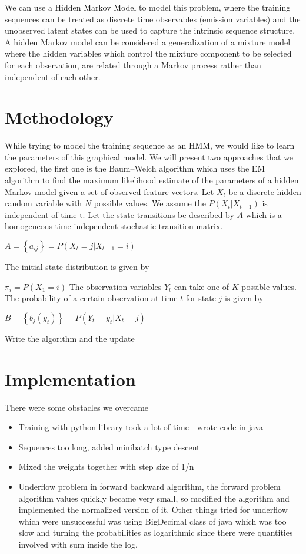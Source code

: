 We can use a Hidden Markov Model to model this problem, where the training sequences can be treated as discrete time observables (emission variables) and the unobserved latent states can be used to capture the intrinsic sequence structure. A hidden Markov model can be considered a generalization of a mixture model where the hidden variables which control the mixture component to be selected for each observation, are related through a Markov process rather than independent of each other. 


\section{Methodology}

While trying to model the training sequence as an HMM, we would like to learn the parameters of this graphical model. We will present two approaches that we explored, the first one is the Baum–Welch algorithm which uses the EM algorithm to find the maximum likelihood estimate of the parameters of a hidden Markov model given a set of observed feature vectors. Let $X_{t}$ be a discrete hidden random variable with $N$ possible values. We assume the $P(X_{t}|X_{t-1})$ is independent of time t. Let the state transitions be described by $A$ which is a homogeneous time independent stochastic transition matrix. 

$A = \left\lbrace a_{ij} \right\rbrace = P(X_{t}=j|X_{t-1}=i)$

The initial state distribution is given by

$\pi_{i} = P(X_{1}=i)$
The observation variables $Y_{t}$ can take one of $K$ possible values. The probability of a certain observation at time $t$ for state $j$ is given by

$B = \left\lbrace b_{j}(y_{t}) \right\rbrace = P(Y_{t}=y_{t}|X_{t}=j)$


Write the algorithm and the update


\section{Implementation}
There were some obstacles we overcame
\begin{itemize}
\item Training with python library took a lot of time - wrote code in java
\item Sequences too long, added minibatch type descent
\item Mixed the weights together with step size of 1/n
\item Underflow problem in forward backward algorithm, the forward problem algorithm values quickly became very small, so modified the algorithm and implemented the normalized version of it. Other things tried for underflow which were unsuccessful was using BigDecimal class of java which was too slow and turning the probabilities as logarithmic since there were quantities involved with sum inside the log. 
\end{itemize}

